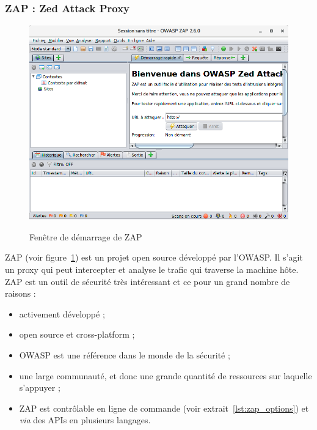 \subsubsection{ZAP : Zed Attack Proxy}
\begin{figure}
	{\includegraphics[width=\textwidth]{images/zap_acceuil}}
	\centering
	\caption{Fenêtre de démarrage de ZAP}
	\label{fig:zap_acceuil}
\end{figure}
ZAP\cite{zap} (voir figure~\ref{fig:zap_acceuil}) est un projet open source développé par l'OWASP\cite{owasp}. Il s'agit un proxy qui peut intercepter et analyse le trafic qui traverse la machine hôte. ZAP est un outil de sécurité très intéressant et ce pour un grand nombre de raisons :
\begin{itemize}[label=$\bullet$]
	\item activement développé\cite{zap_git} ;
	\item open source et cross-platform ;
	\item OWASP est une référence dans le monde de la sécurité ;
	\item une large communauté, et donc une grande quantité de ressources sur laquelle s'appuyer ;
	\item ZAP est contrôlable en ligne de commande (voir extrait~\ref{lst:zap_options}) et \textit{via} des APIs en plusieurs langages.
\end{itemize}

